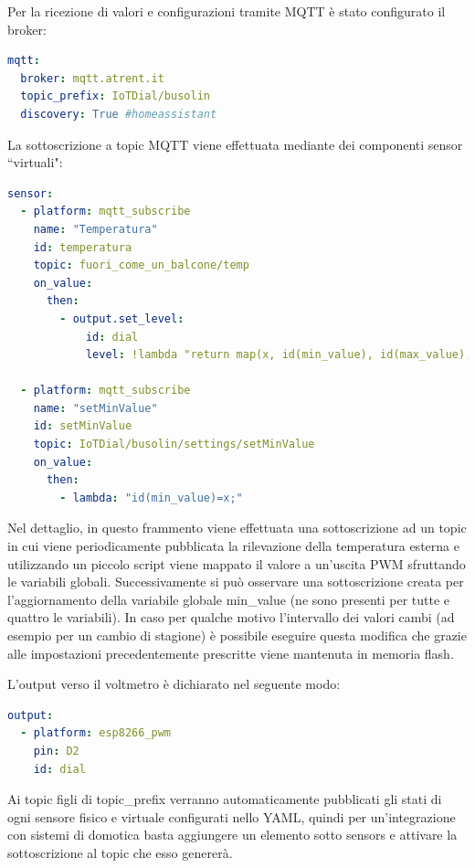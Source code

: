 \documentclass[12pt,a4paper]{report}
\begin{document}
Per la ricezione di valori e configurazioni tramite MQTT è stato configurato il broker:
\begin{lstlisting}[language=yaml]
mqtt:
  broker: mqtt.atrent.it
  topic_prefix: IoTDial/busolin
  discovery: True #homeassistant
\end{lstlisting}
La sottoscrizione a topic MQTT viene effettuata mediante dei componenti sensor ``virtuali":
\begin{lstlisting}[language=yaml]
sensor:
  - platform: mqtt_subscribe
    name: "Temperatura"
    id: temperatura
    topic: fuori_come_un_balcone/temp
    on_value:
      then:
        - output.set_level:
            id: dial
            level: !lambda "return map(x, id(min_value), id(max_value), id(min_pwm), id(max_pwm))/100.0;"

  - platform: mqtt_subscribe
    name: "setMinValue"
    id: setMinValue
    topic: IoTDial/busolin/settings/setMinValue
    on_value:
      then:
        - lambda: "id(min_value)=x;"
\end{lstlisting}
Nel dettaglio, in questo frammento viene effettuata una sottoscrizione ad un topic in cui viene periodicamente pubblicata
la rilevazione della temperatura esterna e utilizzando un piccolo script viene mappato il valore a un'uscita PWM sfruttando le variabili
globali.
Successivamente si può osservare una sottoscrizione creata per l'aggiornamento della variabile globale min_value (ne sono presenti
per tutte e quattro le variabili). In caso per qualche motivo l'intervallo dei valori cambi (ad esempio per un cambio di stagione) è
possibile eseguire questa modifica che grazie alle impostazioni precedentemente prescritte viene mantenuta in memoria flash.

L'output verso il voltmetro è dichiarato nel seguente modo:
\begin{lstlisting}[language=yaml]
output:
  - platform: esp8266_pwm
    pin: D2
    id: dial
\end{lstlisting}

Ai topic figli di topic_prefix verranno automaticamente pubblicati gli stati di ogni sensore fisico e virtuale configurati nello YAML,
quindi per un'integrazione con sistemi di domotica basta aggiungere un elemento sotto sensors e attivare la sottoscrizione al
topic che esso genererà.
\end{document}
